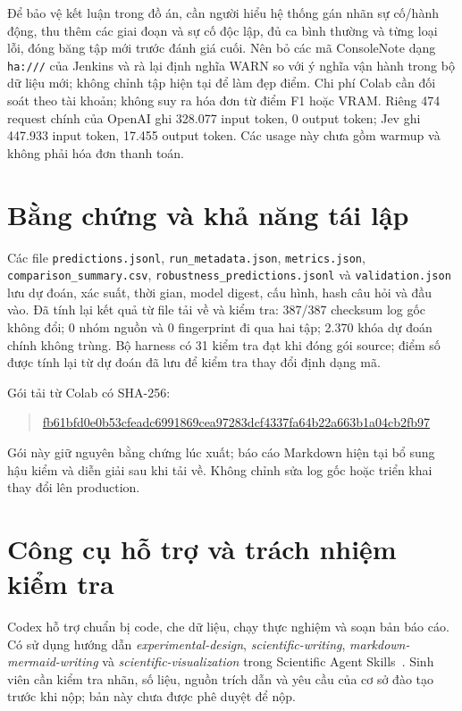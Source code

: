 \documentclass[11pt,a4paper]{article}
\begin{document}
Để bảo vệ kết luận trong đồ án, cần người hiểu hệ thống gán nhãn sự cố/hành động,
thu thêm các giai đoạn và sự cố độc lập, đủ ca bình thường và từng loại lỗi,
đóng băng tập mới trước đánh giá cuối. Nên bỏ các mã ConsoleNote dạng \texttt{ha:///}
của Jenkins và rà lại định nghĩa WARN so với ý nghĩa vận hành trong bộ dữ liệu mới;
không chỉnh tập hiện tại để làm đẹp điểm. Chi phí Colab cần đối soát theo tài khoản;
không suy ra hóa đơn từ điểm F1 hoặc VRAM. Riêng 474 request chính của OpenAI ghi
328.077 input token, 0 output token; Jev ghi 447.933 input token, 17.455 output token.
Các usage này chưa gồm warmup và không phải hóa đơn thanh toán.

\section{Bằng chứng và khả năng tái lập}
Các file \texttt{predictions.jsonl}, \texttt{run\_metadata.json}, \texttt{metrics.json},
\texttt{comparison\_summary.csv}, \texttt{robustness\_predictions.jsonl} và
\texttt{validation.json} lưu dự đoán, xác suất, thời gian, model digest, cấu hình,
hash câu hỏi và đầu vào. Đã tính lại kết quả từ file tải về và kiểm tra:
387/387 checksum log gốc không đổi; 0 nhóm nguồn và 0 fingerprint đi qua hai tập;
2.370 khóa dự đoán chính không trùng. Bộ harness có 31 kiểm tra đạt khi đóng gói source;
điểm số được tính lại từ dự đoán đã lưu để kiểm tra thay đổi định dạng mã.

Gói tải từ Colab có SHA-256:
\begin{quote}\small
\url{fb61bfd0e0b53cfeadc6991869cea97283dcf4337fa64b22a663b1a04cb2fb97}
\end{quote}
Gói này giữ nguyên bằng chứng lúc xuất; báo cáo Markdown hiện tại bổ sung hậu kiểm
và diễn giải sau khi tải về. Không chỉnh sửa log gốc hoặc triển khai thay đổi lên production.

\section*{Công cụ hỗ trợ và trách nhiệm kiểm tra}
Codex hỗ trợ chuẩn bị code, che dữ liệu, chạy thực nghiệm và soạn bản báo cáo.
Có sử dụng hướng dẫn \emph{experimental-design}, \emph{scientific-writing},
\emph{markdown-mermaid-writing} và \emph{scientific-visualization}
trong Scientific Agent Skills~\cite{skills}. Sinh viên cần kiểm tra nhãn, số liệu,
nguồn trích dẫn và yêu cầu của cơ sở đào tạo trước khi nộp; bản này chưa được phê duyệt để nộp.
\end{document}
